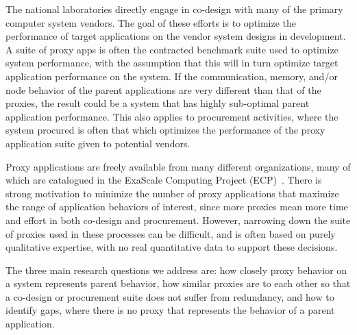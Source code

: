The national laboratories directly engage in co-design with many of the primary computer system vendors. The goal of these efforts is to optimize the performance of target applications on the vendor system designs in development. 
%
A suite of proxy apps is often the contracted benchmark suite used to optimize system performance, with the assumption that this will in turn optimize target application performance on the system.
%
If the communication, memory, and/or node behavior of the parent applications are very different than that of the proxies, the result could be a system that has highly sub-optimal parent application performance. This also applies to procurement activities, where the system procured is often that which optimizes the performance of the proxy application suite given to potential vendors.  
 

Proxy applications are freely available from many different organizations, many of which are catalogued in the ExaScale Computing Project (ECP)~\cite{ECPProxySuite1}.  There is strong motivation to minimize the number of proxy applications that maximize the range of application behaviors of interest, since more proxies mean more time and effort in both co-design and procurement. However, narrowing down the suite of proxies used in these processes can be difficult, and is often based on purely qualitative expertise, with no real quantitative data to support these decisions. 

The three main research questions we address are: how closely proxy behavior on a system represents parent behavior, how similar proxies are to each other so that a co-design or procurement suite does not suffer from redundancy, and how to identify gaps, where there is no proxy that represents the behavior of a parent application.

